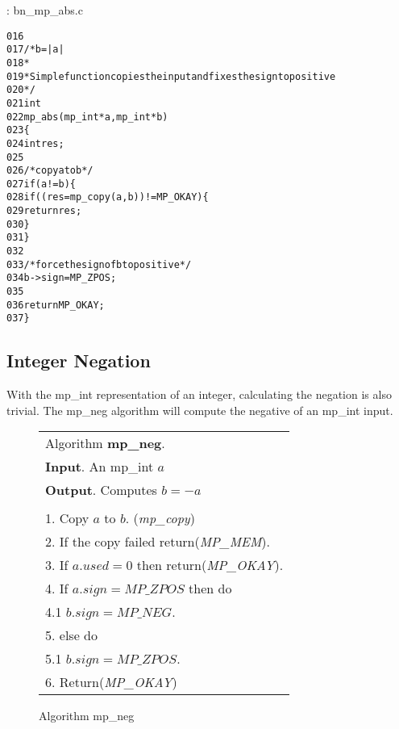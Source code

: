 \documentclass[b5paper]{book}
\begin{document}
\vspace{+3mm}\begin{small}
\hspace{-5.1mm}{\bf File}: bn\_mp\_abs.c
\vspace{-3mm}
\begin{alltt}
016   
017   /* b = |a| 
018    *
019    * Simple function copies the input and fixes the sign to positive
020    */
021   int
022   mp_abs (mp_int * a, mp_int * b)
023   \{
024     int     res;
025   
026     /* copy a to b */
027     if (a != b) \{
028        if ((res = mp_copy (a, b)) != MP_OKAY) \{
029          return res;
030        \}
031     \}
032   
033     /* force the sign of b to positive */
034     b->sign = MP_ZPOS;
035   
036     return MP_OKAY;
037   \}
\end{alltt}
\end{small}

\subsection{Integer Negation}
With the mp\_int representation of an integer, calculating the negation is also trivial.  The mp\_neg algorithm will compute
the negative of an mp\_int input.

\begin{figure}[here]
\begin{center}
\begin{tabular}{l}
\hline Algorithm \textbf{mp\_neg}. \\
\textbf{Input}.   An mp\_int $a$ \\
\textbf{Output}.  Computes $b = -a$ \\
\hline \\
1.  Copy $a$ to $b$.  (\textit{mp\_copy}) \\
2.  If the copy failed return(\textit{MP\_MEM}). \\
3.  If $a.used = 0$ then return(\textit{MP\_OKAY}). \\
4.  If $a.sign = MP\_ZPOS$ then do \\
\hspace{3mm}4.1  $b.sign = MP\_NEG$. \\
5.  else do \\
\hspace{3mm}5.1  $b.sign = MP\_ZPOS$. \\
6.  Return(\textit{MP\_OKAY}) \\
\hline
\end{tabular}
\end{center}
\caption{Algorithm mp\_neg}
\end{figure}
\end{document}
